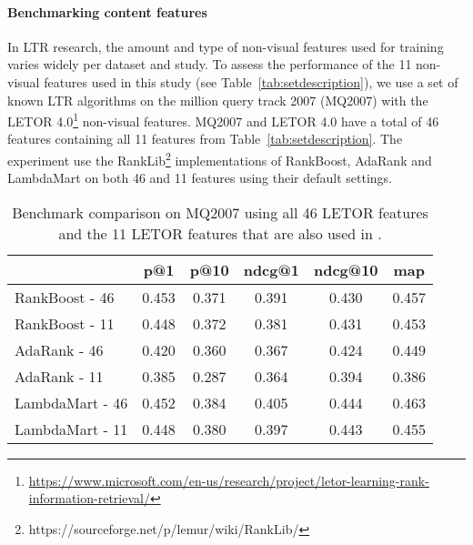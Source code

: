 \paragraph{Benchmarking content features}
In \ac{LTR} research, the amount and type of non-visual features used for training varies widely per dataset and study.
To assess the performance of the 11 non-visual features used in this study (see Table~\ref{tab:setdescription}), we use a set of known LTR algorithms on the million query track 2007 (MQ2007)\cite{allan2007million} with the LETOR 4.0\footnote{\url{https://www.microsoft.com/en-us/research/project/letor-learning-rank-information-retrieval/}} non-visual features.
MQ2007 and LETOR 4.0 have a total of 46 features containing all 11 features from Table~\ref{tab:setdescription}.
The experiment use the RankLib\footnote{https://sourceforge.net/p/lemur/wiki/RankLib/} implementations of RankBoost, AdaRank and LambdaMart on both 46 and 11 features using their default settings. 

\begin{table}[h]
\caption{Benchmark comparison on MQ2007 using all 46 LETOR features and the 11 LETOR features that are also used in \datasetname.}
\label{tab:11vs46}
\centering
\begin{tabular}{lccccc}
\toprule
           & p@1  & p@10   & ndcg@1 & ndcg@10 & map \\ 
\midrule
RankBoost - 46 & 0.453 & 0.371 & 0.391 & 0.430  & 0.457 \\
RankBoost - 11 & 0.448 & 0.372 & 0.381  & 0.431   & 0.453 \\
\midrule
AdaRank - 46  & 0.420 & 0.360 & 0.367 & 0.424  & 0.449 \\
AdaRank - 11  & 0.385 & 0.287 & 0.364  & 0.394   & 0.386 \\ 
\midrule
LambdaMart - 46 & 0.452 & 0.384 & 0.405 & 0.444  & 0.463 \\
LambdaMart - 11 & 0.448 & 0.380 & 0.397  & 0.443   & 0.455 \\
\bottomrule
\end{tabular}
\end{table}

